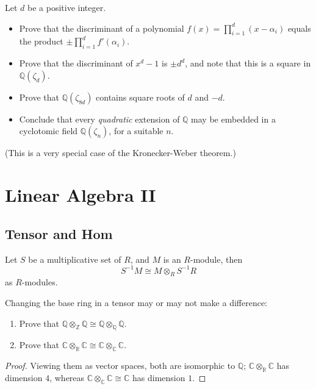 \documentclass[openany]{book}
\newcommand{\R}{\mathbb{R}}
\newcommand{\C}{\mathbb{C}}
\newcommand{\Q}{\mathbb{Q}}
\begin{document}
\begin{prob}
Let \( d \) be a positive integer.  

\begin{itemize}
    \item Prove that the discriminant of a polynomial \( f(x) = \prod_{i=1}^d (x - \alpha_i) \) equals the product \( \pm \prod_{i=1}^d f'(\alpha_i) \).  
    \item Prove that the discriminant of \( x^d - 1 \) is \( \pm d^d \), and note that this is a square in \( \mathbb{Q}(\zeta_d) \).  
    \item Prove that \( \mathbb{Q}(\zeta_{8d}) \) contains square roots of \( d \) and \( -d \).  
    \item Conclude that every \emph{quadratic} extension of \( \mathbb{Q} \) may be embedded in a cyclotomic field \( \mathbb{Q}(\zeta_n) \), for a suitable \( n \).  
\end{itemize}

(This is a very special case of the Kronecker-Weber theorem.)
\end{prob}


















\chapter{Linear Algebra II}



\section{Tensor and Hom}
\begin{prop}
    Let $S$ be a multiplicative set of $R$, and $M$ is an $R$-module, then 
    \begin{equation*}
        S^{-1}M\cong M\otimes_R S^{-1}R
    \end{equation*}
    as $R$-modules.
\end{prop}

\begin{prob}[2.7]
    Changing the base ring in a tensor may or may not make a difference:
    
    \begin{enumerate}
        \item Prove that \( \mathbb{Q} \otimes_{\mathbb{Z}} \mathbb{Q} \cong \mathbb{Q} \otimes_{\mathbb{Q}} \mathbb{Q} \).
        \item Prove that \( \mathbb{C} \otimes_{\mathbb{R}} \mathbb{C} \cong \mathbb{C} \otimes_{\mathbb{C}} \mathbb{C} \).
    \end{enumerate}
    \end{prob}
\begin{proof}
    Viewing them as vector spaces, both are isomorphic to $\Q$; $\C\otimes_\R\C$ has dimension $4$, whereas $\C\otimes_\C\C\cong\C$ has dimension $1$.
\end{proof}
    
\end{document}
